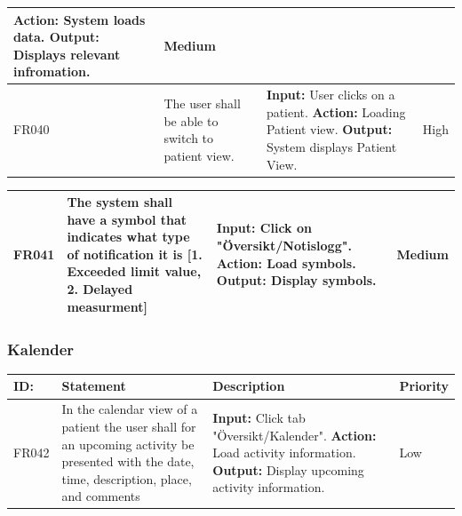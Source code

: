 \documentclass{scrreprt}
\begin{document}
\begin{center}
\begin{tabularx}{\linewidth}{| l | X | X | l |}
\newline \textbf{Action:} System loads data.
\newline \textbf{Output:} Displays relevant infromation. & Medium \\ 
\hline
FR040 & The user shall be able to switch to patient view. & \textbf{Input:} User clicks on a patient.
\newline \textbf{Action:} Loading Patient view.
\newline \textbf{Output:} System displays Patient View. & High \\ 
\hline
\end{tabularx}
\begin{tabularx}{\linewidth}{| l | X | X | l |}
\hline
FR041 & The system shall have a symbol that indicates what type of notification it is [1. Exceeded limit value, 2. Delayed measurment] & \textbf{Input:} Click on "Översikt/Notislogg".
\newline \textbf{Action:} Load symbols.
\newline \textbf{Output:} Display symbols. & Medium \\ 
\hline
\end{tabularx}
\end{center}

\subsubsection{Kalender}
\begin{center}
\begin{tabularx}{\linewidth}{| l | X | X | l |}
\hline
\textbf{ID:} & \textbf{Statement} & \textbf{Description} & \textbf{Priority} \\ 
\hline
FR042 & In the calendar view of a patient the user shall for an upcoming activity be presented with the date, time, description, place, and comments & \textbf{Input:} Click tab "Översikt/Kalender".
\newline \textbf{Action:} Load activity information.
\newline \textbf{Output:} Display upcoming  activity information. & Low \\ 
\hline
\end{tabularx}
\end{center}
\end{document}
